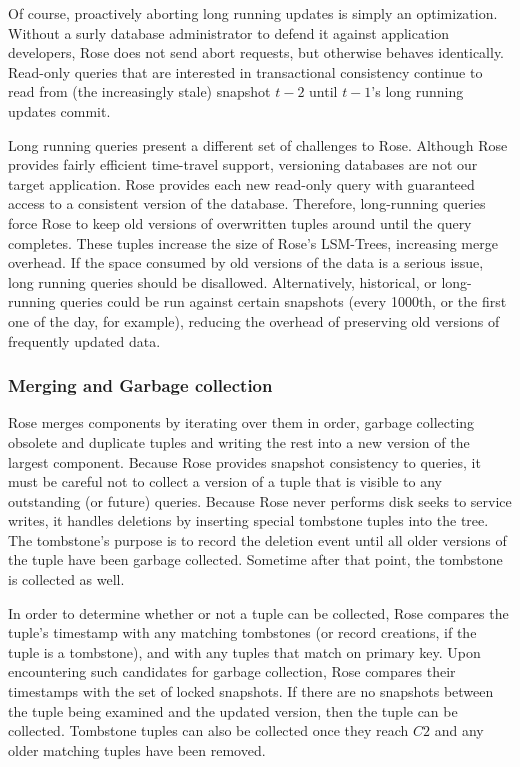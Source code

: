 \documentclass{vldb}
\newcommand{\rows}{Rose\xspace}
\newcommand{\rowss}{Rose's\xspace}
\begin{document}
Of course, proactively aborting long running updates is simply an
optimization.  Without a surly database administrator to defend it
against application developers, \rows does not send abort requests,
but otherwise behaves identically.  Read-only queries that are
interested in transactional consistency continue to read from (the
increasingly stale) snapshot $t-2$ until $t-1$'s long running
updates commit.

Long running queries present a different set of challenges to \rows.
Although \rows provides fairly efficient time-travel support,
versioning databases are not our target application.  \rows
provides each new read-only query with guaranteed access to a
consistent version of the database.  Therefore, long-running queries
force \rows to keep old versions of overwritten tuples around until
the query completes.  These tuples increase the size of \rowss
LSM-Trees, increasing merge overhead.  If the space consumed by old
versions of the data is a serious issue, long running queries should
be disallowed.  Alternatively, historical, or long-running queries
could be run against certain snapshots (every 1000th, or the first
one of the day, for example), reducing the overhead of preserving
old versions of frequently updated data.

\subsubsection{Merging and Garbage collection}

\rows merges components by iterating over them in order, garbage collecting
obsolete and duplicate tuples and writing the rest into a new version
of the largest component.  Because \rows provides snapshot consistency
to queries, it must be careful not to collect a version of a tuple that
is visible to any outstanding (or future) queries.  Because \rows
never performs disk seeks to service writes, it handles deletions by
inserting special tombstone tuples into the tree.  The tombstone's
purpose is to record the deletion event until all older versions of
the tuple have been garbage collected.  Sometime after that point, the tombstone
is collected as well.

In order to determine whether or not a tuple can be collected, \rows
compares the tuple's timestamp with any matching tombstones (or record
creations, if the tuple is a tombstone), and with any tuples that
match on primary key.  Upon encountering such candidates for garbage collection,
\rows compares their timestamps with the set of locked snapshots.  If
there are no snapshots between the tuple being examined and the
updated version, then the tuple can be collected.  Tombstone tuples can
also be collected once they reach $C2$ and any older matching tuples
have been removed.
\end{document}

